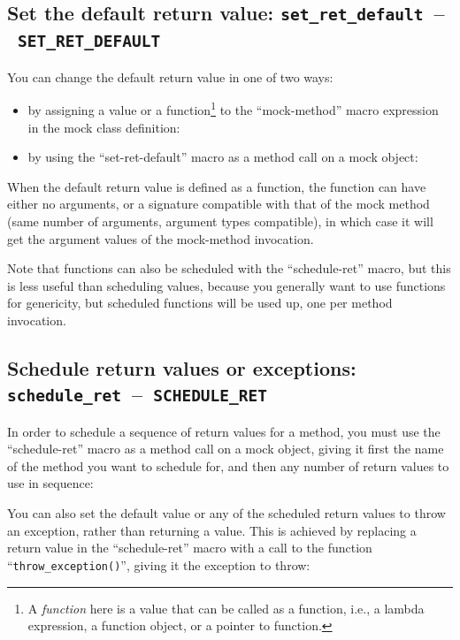 \documentclass[twoside, a4paper, article]{memoir}
\newcommand*\testudocolor{\color{red!80!blue}}
\newcommand*\testudo[1]{\texttt{\testudocolor{}#1}}
\newcommand*\testudopair[2]{\testudo{#1}~--~\testudo{#2}}
\newcommand\subsectiontestudopair[3]{%
  \subsection[#1]{#1: \testudopair{#2}{#3}}}
\providecommand\typesetexample[1]{%
}
\begin{document}
\subsectiontestudopair{Set the default return value}%
  {set\_ret\_default}{SET\_RET\_DEFAULT}

You can change the default return value in one of two ways:
\begin{itemize}
\item by assigning a value or a function\footnote{A \emph{function} here is a
    value that can be called as a function, i.e., a lambda expression, a
    function object, or a pointer to function.} to the ``mock-method'' macro
  expression in the mock class definition:

  \typesetexample{mock-class-mock-method-default-return-value-assign}

\item by using the ``set-ret-default'' macro as a method call on a mock object:

  \typesetexample{mock-class-mock-method-default-return-value-set-ret-default}

\end{itemize}

When the default return value is defined as a function, the function can have
either no arguments, or a signature compatible with that of the mock method
(same number of arguments, argument types compatible), in which case it will
get the argument values of the mock-method invocation.

Note that functions can also be scheduled with the ``schedule-ret'' macro, but
this is less useful than scheduling values, because you generally want to use
functions for genericity, but scheduled functions will be used up, one per
method invocation.

\subsectiontestudopair{Schedule return values or exceptions}%
  {schedule\_ret}{SCHEDULE\_RET}

In order to schedule a sequence of return values for a method, you must use the
``schedule-ret'' macro as a method call on a mock object, giving it first the
name of the method you want to schedule for, and then any number of return
values to use in sequence:

\typesetexample{mock-class-mock-method-schedule-ret}

You can also set the default value or any of the scheduled return values to
throw an exception, rather than returning a value.  This is achieved by
replacing a return value in the ``schedule-ret'' macro with a call to the
function ``\texttt{throw\_exception()}'', giving it the exception to throw:

\typesetexample{mock-class-mock-method-schedule-exception}
\end{document}
